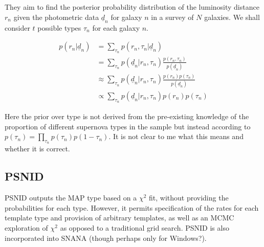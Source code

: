\documentclass[12pt, onecolumn]{emulateapj}
\newcommand{\textul}{\underline}
\begin{document}
They aim to find the posterior probability distribution of the luminosity distance $r_{n}$ given the photometric data $\textul{d}_{n}$ for galaxy $n$ in a survey of $N$ galaxies.  We shall consider $t$ possible types $\tau_{n}$ for each galaxy $n$.

\begin{align*}
p(r_{n}|\textul{d}_{n}) &= \sum_{\tau_{n}}p(r_{n},\tau_{n}|\textul{d}_{n})\\
&= \sum_{\tau_{n}}p(\textul{d}_{n}|r_{n},\tau_{n})\frac{p(r_{n},\tau_{n})}{p(\textul{d}_{n})}\\
&\approx \sum_{\tau_{n}}p(\textul{d}_{n}|r_{n},\tau_{n})\frac{p(r_{n})p(\tau_{n})}{p(\textul{d}_{n})}\\
&\propto \sum_{\tau_{n}}p(\textul{d}_{n}|r_{n},\tau_{n})p(r_{n})p(\tau_{n})
\end{align*}

Here the prior over type is not derived from the pre-existing knowledge of the proportion of different supernova types in the sample but instead according to $p(\tau_{n})=\prod_{\tau_{n}}p(\tau_{n})p(1-\tau_{n})$.  It is not clear to me what this means and whether it is correct.

\subsection{PSNID}

PSNID outputs the MAP type based on a $\chi^{2}$ fit, without providing the probabilities for each type.  However, it permits specification of the rates for each template type and provision of arbitrary templates, as well as an MCMC exploration of $\chi^{2}$ as opposed to a traditional grid search.  PSNID is also incorporated into SNANA (though perhaps only for Windows?).




\end{document}
